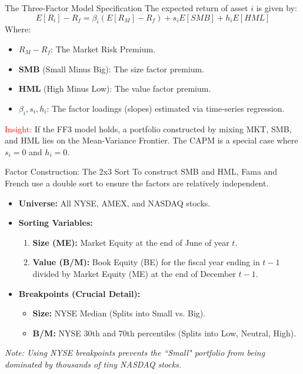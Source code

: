 \documentclass{beamer}
\begin{document}
\begin{frame}{The Three-Factor Model Specification}
	The expected return of asset $i$ is given by:
	\begin{equation}
		E[R_{i}] - R_f = \beta_{i}(E[R_{M}] - R_{f}) + s_{i} E[SMB] + h_{i} E[HML]
	\end{equation}
	Where:
	\begin{itemize}
		\item $R_M - R_f$: The Market Risk Premium.
		\item \textbf{SMB} (Small Minus Big): The size factor premium.
		\item \textbf{HML} (High Minus Low): The value factor premium.
		\item $\beta_i, s_i, h_i$: The factor loadings (slopes) estimated via time-series regression.
	\end{itemize}
	
	\vspace{0.5cm}
	\footnotesize
	\textcolor{red}{Insight:} If the FF3 model holds, a portfolio constructed by mixing MKT, SMB, and HML lies on the Mean-Variance Frontier. The CAPM is a special case where $s_i = 0$ and $h_i = 0$.
\end{frame}

\begin{frame}{Factor Construction: The 2x3 Sort}
	To construct SMB and HML, Fama and French use a double sort to ensure the factors are relatively independent.
	
	\begin{itemize}
		\item \textbf{Universe:} All NYSE, AMEX, and NASDAQ stocks.
		\item \textbf{Sorting Variables:}
		\begin{enumerate}
			\item \textbf{Size (ME):} Market Equity at the end of June of year $t$.
			\item \textbf{Value (B/M):} Book Equity (BE) for the fiscal year ending in $t-1$ divided by Market Equity (ME) at the end of December $t-1$.
		\end{enumerate}
		\item \textbf{Breakpoints (Crucial Detail):}
		\begin{itemize}
			\item \textbf{Size:} NYSE Median (Splits into Small vs. Big).
			\item \textbf{B/M:} NYSE 30th and 70th percentiles (Splits into Low, Neutral, High).
		\end{itemize}
	\end{itemize}
	\textit{Note: Using NYSE breakpoints prevents the ``Small" portfolio from being dominated by thousands of tiny NASDAQ stocks.}
\end{frame}
\end{document}

